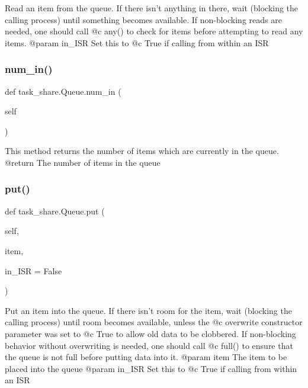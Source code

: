 \begin{DoxyVerb}Read an item from the queue. If there isn't anything in there,
wait (blocking the calling process) until something becomes
available. If non-blocking reads are needed, one should call @c any()
to check for items before attempting to read any items.
@param in_ISR Set this to @c True if calling from within an ISR \end{DoxyVerb}
 \mbox{\label{classtask__share_1_1Queue_a713321bacac5d93ecf89c4be1c15fe30}} 
\subsubsection{\texorpdfstring{num\+\_\+in()}{num\_in()}}
{\footnotesize\ttfamily def task\+\_\+share.\+Queue.\+num\+\_\+in (\begin{DoxyParamCaption}\item[{}]{self }\end{DoxyParamCaption})}

\begin{DoxyVerb}This method returns the number of items which are currently in the 
queue.
@return The number of items in the queue \end{DoxyVerb}
 \mbox{\label{classtask__share_1_1Queue_ae785bdf9d397d61729c22656471a81df}} 
\subsubsection{\texorpdfstring{put()}{put()}}
{\footnotesize\ttfamily def task\+\_\+share.\+Queue.\+put (\begin{DoxyParamCaption}\item[{}]{self,  }\item[{}]{item,  }\item[{}]{in\+\_\+\+I\+SR = {\ttfamily False} }\end{DoxyParamCaption})}

\begin{DoxyVerb}Put an item into the queue. If there isn't room for the item, wait 
(blocking the calling process) until room becomes available,
unless the @c overwrite constructor parameter was set to @c True to 
allow old data to be clobbered. If non-blocking behavior without
overwriting is needed, one should call @c full() to ensure that the 
queue is not full before putting data into it.
@param item The item to be placed into the queue
@param in_ISR Set this to @c True if calling from within an ISR \end{DoxyVerb}
 

